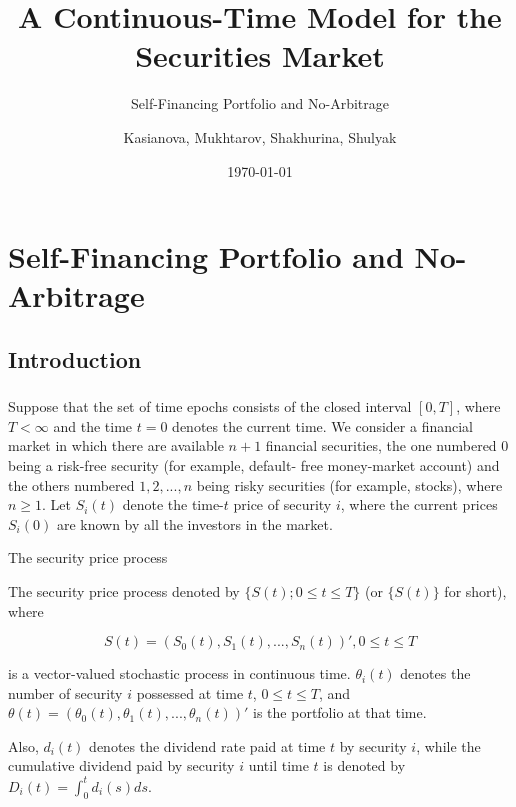 \documentclass[c, dvipsnames, 8pt]{beamer}
\title[Self-Financing Portfolio and No-Arbitrage]  
{A Continuous-Time Model for the	Securities Market}
\subtitle{Self-Financing Portfolio and No-Arbitrage}
\author[]{Kasianova, Mukhtarov, Shakhurina, Shulyak}
\institute[]{Higher School of Economics}
\date{\today}
\begin{document}
	
	
\maketitle

\section{Self-Financing Portfolio and No-Arbitrage}
\subsection{Introduction}

\begin{frame}[shrink=5]

\frametitle{\insertsection} 
\framesubtitle{\insertsubsection} 


Suppose that the set of time epochs consists of the closed interval $[0, T]$,
where $T < \infty$ and the time $t = 0$ denotes the current time. We consider a financial market in which there are available $n + 1$ financial
securities, the one numbered $0$ being a risk-free security (for example, default-
free money-market account) and the others numbered $1, 2, . . . , n$ being risky
securities (for example, stocks), where $n \geq 1$.
Let $S_i(t)$ denote the time-$t$ price of security $i$, where the current prices
$S_i(0)$ are known by all the investors in the market. 

\begin{block}{The security price process}
	
	The security price process
	denoted by $\{S(t); 0 \leq t \leq T\}$ (or $\{S(t)\}$ for short), where
	
	$$S(t) = (S_0(t), S_1(t), . . . , S_n(t))', 0 \leq t \leq T$$
	
	is a vector-valued stochastic process in continuous time.  $\theta_i(t)$ denotes the number of security $i$
	possessed at time $t$, $0 \leq t \leq T$, and $\theta(t) = (\theta_0(t), \theta_1(t), . . . , \theta_n(t))'$ is the
	portfolio at that time. 
		
\end{block}



Also, $d_i(t)$ denotes the dividend rate paid at time $t$
by security $i$, while the cumulative dividend paid by security $i$ until time $t$ is
denoted by $D_i(t) = \int^t_0 d_i(s)ds$.


\end{frame}
\end{document}
